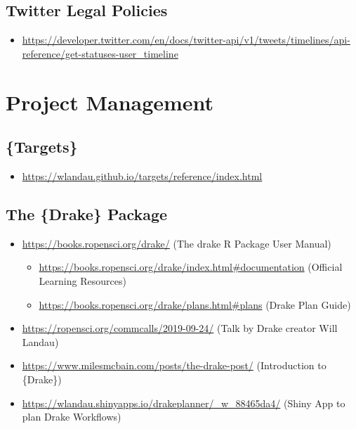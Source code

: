 \documentclass[
]{book}
\providecommand{\tightlist}{%
  \setlength{\itemsep}{0pt}\setlength{\parskip}{0pt}}
\begin{document}
\hypertarget{twitter-legal-policies}{%
\subsection{Twitter Legal Policies}\label{twitter-legal-policies}}

\begin{itemize}
\tightlist
\item
  \url{https://developer.twitter.com/en/docs/twitter-api/v1/tweets/timelines/api-reference/get-statuses-user_timeline}
\end{itemize}

\hypertarget{project-management}{%
\section{Project Management}\label{project-management}}

\hypertarget{targets}{%
\subsection{\{Targets\}}\label{targets}}

\begin{itemize}
\tightlist
\item
  \url{https://wlandau.github.io/targets/reference/index.html}
\end{itemize}

\hypertarget{the-drake-package}{%
\subsection{The \{Drake\} Package}\label{the-drake-package}}

\begin{itemize}
\tightlist
\item
  \url{https://books.ropensci.org/drake/} (The drake R Package User Manual)

  \begin{itemize}
  \tightlist
  \item
    \url{https://books.ropensci.org/drake/index.html\#documentation} (Official Learning Resources)
  \item
    \url{https://books.ropensci.org/drake/plans.html\#plans} (Drake Plan Guide)
  \end{itemize}
\item
  \url{https://ropensci.org/commcalls/2019-09-24/} (Talk by Drake creator Will Landau)
\item
  \url{https://www.milesmcbain.com/posts/the-drake-post/} (Introduction to \{Drake\})
\item
  \url{https://wlandau.shinyapps.io/drakeplanner/_w_88465da4/} (Shiny App to plan Drake Workflows)
\end{itemize}
\end{document}
